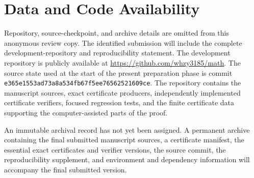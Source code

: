 \section*{Data and Code Availability}
\label{sec:data-code}

\ifdefined\TargetAAnonymous
Repository, source-checkpoint, and archive details are omitted from this
anonymous review copy.  The identified submission will include the complete
development-repository and reproducibility statement.
\else
The development repository is publicly available at
\url{https://github.com/whzy3185/math}.  The source state used at the start of
the present preparation phase is commit
\texttt{e365e1553ad73a8a534f\allowbreak b67f5ee76562521609ce}.  The repository contains the
manuscript sources, exact certificate producers, independently implemented
certificate verifiers, focused regression tests, and the finite certificate
data supporting the computer-assisted parts of the proof.

An immutable archival record has not yet been assigned.  A permanent archive
containing the final submitted manuscript sources, a certificate manifest,
the essential exact certificates and verifier versions, the source commit,
the reproducibility supplement, and environment and dependency information
will accompany the final submitted version.
\fi
